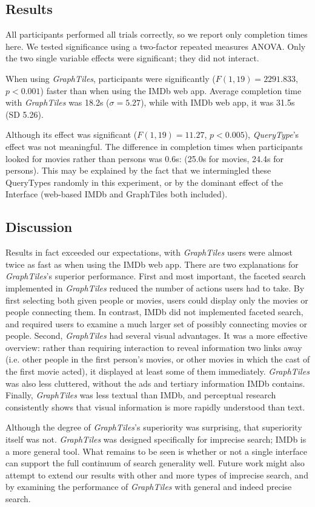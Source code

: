 \subsection{Results}

All participants performed all trials correctly, so we report only completion times here. We tested significance using a two-factor repeated measures ANOVA. Only the two single variable effects were significant; they did not interact. 

When using \textit{GraphTiles}, participants were significantly ($F(1,19)=2291.833$, $p<0.001$) faster than when using the IMDb web app. Average completion time with \textit{GraphTiles} was 18.2s ($\sigma =5.27$), while with IMDb web app, it was 31.5s (SD 5.26).

Although its effect was significant ($F(1,19)=11.27$, $p<0.005$), \textit{QueryType}'s effect was not meaningful. The difference in completion times when participants looked for movies rather than persons was 0.6s: (25.0s for movies, 24.4s for persons). This may be explained by the fact that we intermingled these QueryTypes randomly in this experiment, or by the dominant effect of the Interface (web-based IMDb and GraphTiles both included).

\subsection{Discussion}

Results in fact exceeded our expectations, with \textit{GraphTiles} users were almost twice as fast as when using the IMDb web app. There are two explanations for \textit{GraphTiles}'s superior performance. First and most important, the faceted search implemented in \textit{GraphTiles} reduced the number of actions users had to take. By first selecting both given people or movies, users could display only the movies or people connecting them. In contrast, IMDb did not implemented faceted search, and required users to examine a much larger set of possibly connecting movies or people. Second, \textit{GraphTiles} had several visual advantages. It was a more effective overview: rather than requiring interaction to reveal information two links away (i.e. other people in the first person's movies, or other movies in which the cast of the first movie acted), it displayed at least some of them immediately. \textit{GraphTiles} was also less cluttered, without the ads and tertiary information IMDb contains. Finally, \textit{GraphTiles} was less textual than IMDb, and perceptual research consistently shows that visual information is more rapidly understood than text.

Although the degree of \textit{GraphTiles}'s superiority was surprising, that superiority itself was not. \textit{GraphTiles} was designed specifically for imprecise search; IMDb is a more general tool. What remains to be seen is whether or not a single interface can support the full continuum of search generality well. Future work might also attempt to extend our results with other and more types of imprecise search, and by examining the performance of \textit{GraphTiles} with general and indeed precise search.
